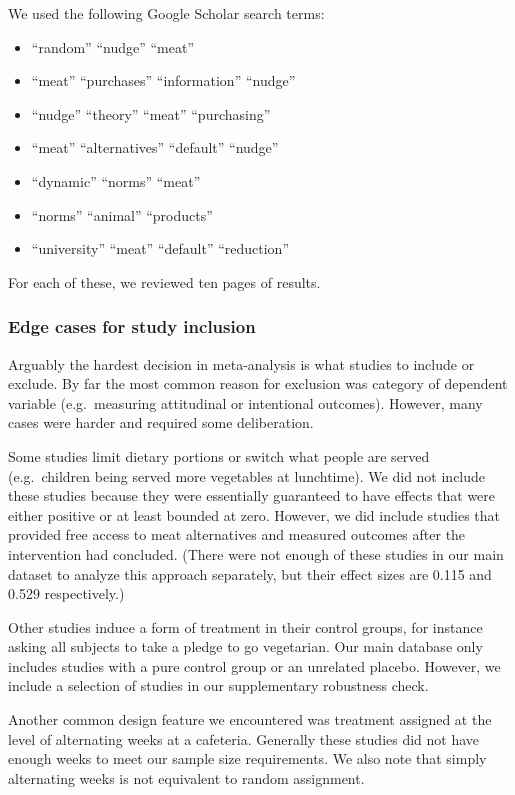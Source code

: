 \documentclass[sn-nature,referee,pdflatex]{sn-jnl}
\providecommand{\tightlist}{%
  \setlength{\itemsep}{0pt}\setlength{\parskip}{0pt}}
\begin{document}
We used the following Google Scholar search terms:

\begin{itemize}
\tightlist
\item
  ``random'' ``nudge'' ``meat''
\item
  ``meat'' ``purchases'' ``information'' ``nudge''
\item
  ``nudge'' ``theory'' ``meat'' ``purchasing''
\item
  ``meat'' ``alternatives'' ``default'' ``nudge''
\item
  ``dynamic'' ``norms'' ``meat''
\item
  ``norms'' ``animal'' ``products''
\item
  ``university'' ``meat'' ``default'' ``reduction''
\end{itemize}

For each of these, we reviewed ten pages of results.

\subsubsection{Edge cases for study inclusion}\label{sec5.4.2}

Arguably the hardest decision in meta-analysis is what studies to
include or exclude. By far the most common reason for exclusion was
category of dependent variable (e.g.~measuring attitudinal or
intentional outcomes). However, many cases were harder and required some
deliberation.

Some studies limit dietary portions or switch what people are served
(e.g.~children being served more vegetables at lunchtime). We did not
include these studies because they were essentially guaranteed to have
effects that were either positive or at least bounded at zero. However,
we did include studies that provided free access to meat alternatives
\citep{acharya2004, bianchi2022} and measured outcomes after the
intervention had concluded. (There were not enough of these studies in
our main dataset to analyze this approach separately, but their effect
sizes are 0.115 and 0.529 respectively.)

Other studies induce a form of treatment in their control groups, for
instance asking all subjects to take a pledge to go vegetarian. Our main
database only includes studies with a pure control group or an unrelated
placebo. However, we include a selection of studies in our supplementary
robustness check.

Another common design feature we encountered was treatment assigned at
the level of alternating weeks at a cafeteria. Generally these studies
did not have enough weeks to meet our sample size requirements. We also
note that simply alternating weeks is not equivalent to random
assignment.
\end{document}
